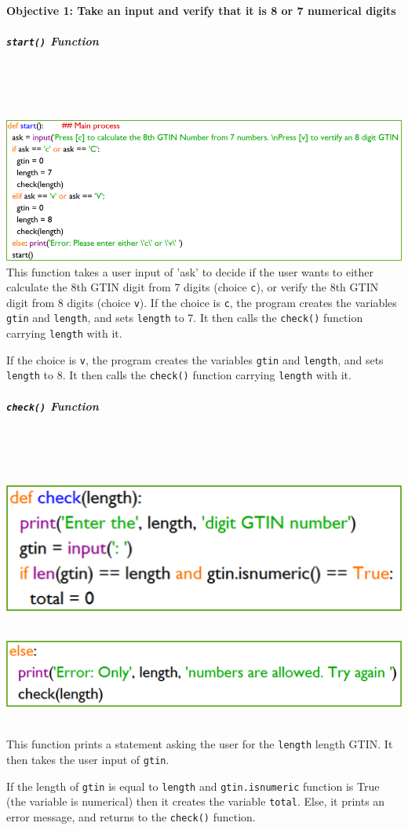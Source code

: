 \documentclass[a4paper]{article}
\begin{document}
\paragraph{Objective 1: Take an input and verify that it is 8 or 7 numerical digits}
\subparagraph{\texttt{start()} Function} ~ \par ~ \par
\noindent\includegraphics{task1_start()function.png}
This function takes a user input of 'ask' to decide if the user wants to either calculate the 8th GTIN digit from 7 digits (choice \verb|c|), or verify the 8th GTIN digit from 8 digits (choice \verb|v|). 
If the choice is \verb|c|, the program creates the variables \verb|gtin| and \verb|length|, and sets \verb|length| to 7. It then calls the \verb|check()| function carrying \verb|length| with it. \par
If the choice is \verb|v|, the program creates the variables \verb|gtin| and \verb|length|, and sets \verb|length| to 8. It then calls the \verb|check()| function carrying \verb|length| with it.
\par
\subparagraph{\texttt{check()} Function} ~ \par ~ \par
\noindent\includegraphics{task1_check()function2.png} ~ \par
\noindent\includegraphics{task1_check()function3.png} ~\par
This function prints a statement asking the user for the \verb|length| length GTIN. It then takes the user input of \verb|gtin|. \par
If the length of \verb|gtin| is equal to \verb|length| and \verb|gtin.isnumeric| function is True (the variable is numerical) then it creates the variable \verb|total|. Else, it prints an error message, and returns to the \verb|check()| function.
\newpage
\end{document}
